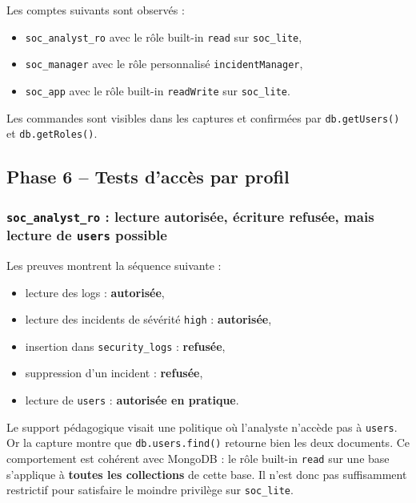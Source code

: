\documentclass[11pt,a4paper]{article}
\begin{document}
Les comptes suivants sont observés :
\begin{itemize}
  \item \texttt{soc\_analyst\_ro} avec le rôle built-in \texttt{read} sur \texttt{soc\_lite},
  \item \texttt{soc\_manager} avec le rôle personnalisé \texttt{incidentManager},
  \item \texttt{soc\_app} avec le rôle built-in \texttt{readWrite} sur \texttt{soc\_lite}.
\end{itemize}

Les commandes sont visibles dans les captures et confirmées par \texttt{db.getUsers()} et \texttt{db.getRoles()}.

\subsection{Phase 6 -- Tests d'accès par profil}

\subsubsection{\texttt{soc\_analyst\_ro} : lecture autorisée, écriture refusée, mais lecture de \texttt{users} possible}

Les preuves montrent la séquence suivante :
\begin{itemize}
  \item lecture des logs : \textbf{autorisée},
  \item lecture des incidents de sévérité \texttt{high} : \textbf{autorisée},
  \item insertion dans \texttt{security\_logs} : \textbf{refusée},
  \item suppression d'un incident : \textbf{refusée},
  \item lecture de \texttt{users} : \textbf{autorisée en pratique}.
\end{itemize}

\begin{warnbox}
Le support pédagogique visait une politique où l'analyste n'accède pas à \texttt{users}. Or la capture montre que \texttt{db.users.find()} retourne bien les deux documents. Ce comportement est cohérent avec MongoDB : le rôle built-in \texttt{read} sur une base s'applique à \textbf{toutes les collections} de cette base. Il n'est donc pas suffisamment restrictif pour satisfaire le moindre privilège sur \texttt{soc\_lite}.
\end{warnbox}
\end{document}
